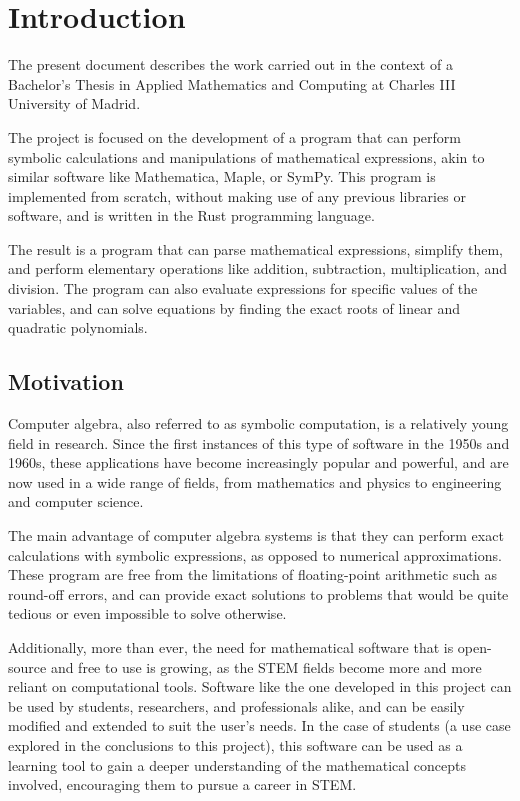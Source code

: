 \chapter{Introduction}\label{chap:introduction}

The present document describes the work carried out in the context of a Bachelor's Thesis in Applied Mathematics and Computing at Charles III University of Madrid.

The project is focused on the development of a program that can perform symbolic calculations and manipulations of mathematical expressions, akin to similar software like Mathematica, Maple, or SymPy. This program is implemented from scratch, without making use of any previous libraries or software, and is written in the Rust programming language.

The result is a program that can parse mathematical expressions, simplify them, and perform elementary operations like addition, subtraction, multiplication, and division. The program can also evaluate expressions for specific values of the variables, and can solve equations by finding the exact roots of linear and quadratic polynomials.

\section{Motivation}\label{sec:motivation}

Computer algebra, also referred to as symbolic computation, is a relatively young field in research. Since the first instances of this type of software in the 1950s and 1960s, these applications have become increasingly popular and powerful, and are now used in a wide range of fields, from mathematics and physics to engineering and computer science.

The main advantage of computer algebra systems is that they can perform exact calculations with symbolic expressions, as opposed to numerical approximations. These program are free from the limitations of floating-point arithmetic such as round-off errors, and can provide exact solutions to problems that would be quite tedious or even impossible to solve otherwise.

Additionally, more than ever, the need for mathematical software that is open-source and free to use is growing, as the STEM fields become more and more reliant on computational tools. Software like the one developed in this project can be used by students, researchers, and professionals alike, and can be easily modified and extended to suit the user's needs. In the case of students (a use case explored in the conclusions to this project), this software can be used as a learning tool to gain a deeper understanding of the mathematical concepts involved, encouraging them to pursue a career in STEM.


